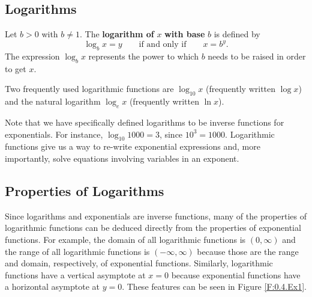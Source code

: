 

\subsection*{Logarithms}

\begin{definition}
Let $b>0$ with $b\neq1$. The \textbf{logarithm of }$x$ \textbf{with base }$b$ is defined by
	\[
		\log_{b}x=y\qquad\mbox{if and only if}\qquad x=b^{y}.
	\]
The expression $\log_{b}x$ represents the power to which $b$ needs to be raised in order to get $x$.

Two frequently used logarithmic functions are $\log_{10}x$ (frequently written $\log x$) and the natural logarithm $\log_{e}x$ (frequently written $\ln x$).
\end{definition}

Note that we have specifically defined logarithms to be inverse functions for
exponentials. For instance, $\log_{10}{1000} = 3$, since $10^{3} = 1000$.  Logarithmic
functions give us a way to re-write exponential expressions and, more importantly, solve
equations involving variables in an exponent.

\subsection*{Properties of Logarithms}
Since logarithms and exponentials are inverse functions, many of the properties of
logarithmic functions can be deduced directly from the properties of exponential
functions.  For example, the domain of all logarithmic functions is $(0,\infty)$ and the
range of all logarithmic functions is $(-\infty,\infty)$ because those are the range and
domain, respectively, of exponential functions.  Similarly, logarithmic functions have a
vertical asymptote at $x = 0$ because exponential functions have a horizontal asymptote at
$y = 0$. These features can be seen in Figure \ref{F:0.4.Ex1}. 

